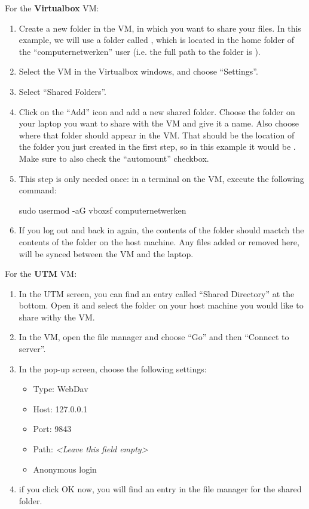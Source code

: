 For the \textbf{Virtualbox} VM:
\begin{enumerate}
	\item Create a new folder in the VM, in which you want to share your files. In this example, we will use a folder called , which is located in the home folder of the ``computernetwerken'' user (i.e. the full path to the folder is ).
	\item Select the VM in the Virtualbox windows, and choose ``Settings''.
	\item Select ``Shared Folders''.
	\item Click on the ``Add'' icon and add a new shared folder. Choose the folder on your laptop you want to share with the VM and give it a name. Also choose where that folder should appear in the VM. That should be the location of the folder you just created in the first step, so in this example it would be . Make sure to also check the ``automount'' checkbox.
	\item This step is only needed once: in a terminal on the VM, execute the following command:

	\begin{cmdblock}[gobble=1]
		sudo usermod -aG vboxsf computernetwerken
	\end{cmdblock}

	\item If you log out and back in again, the contents of the  folder should mactch the contents of the folder on the host machine. Any files added or removed here, will be synced between the VM and the laptop.
\end{enumerate}

For the \textbf{UTM} VM:
\begin{enumerate}
	\item In the UTM screen, you can find an entry called ``Shared Directory'' at the bottom. Open it and select the folder on your host machine you would like to share withy the VM.
	\item In the VM, open the file manager and choose ``Go'' and then ``Connect to server''.
	\item In the pop-up screen, choose the following settings:
	\begin{itemize}
		\item Type: WebDav
		\item Host: 127.0.0.1
		\item Port: 9843
		\item Path: \emph{<Leave this field empty>}
		\item Anonymous login
	\end{itemize}
	\item if you click OK now, you will find an entry in the file manager for the shared folder.
\end{enumerate}

